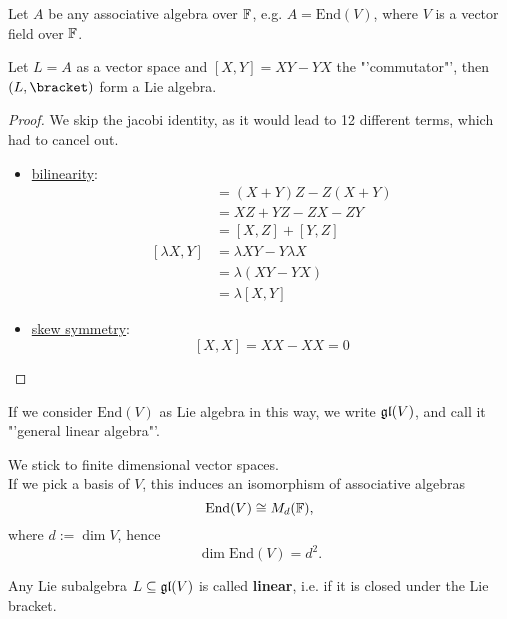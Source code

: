 \begin{example}
    Let $A$ be any associative algebra over $\mathbb{F}$, e.g. $A = \textrm{End}(V)$, 
    where $V$ is a vector field over $\mathbb{F}$.

    Let $L = A$ as a vector space and $[X,Y] = XY -YX$ the "'commutator"', 
    then $(L, \bracket)$ form a Lie algebra.
\end{example}
\begin{proof} We skip the jacobi identity, as it would lead to 12 different terms, which had to cancel out.
    \begin{itemize}
        \item \underline{bilinearity}:
        \begin{align*}
            [X + Y, Z] &= (X + Y)Z - Z(X + Y) \\
                       &= XZ + YZ - ZX - ZY \\
                       &= [X,Z] + [Y,Z] \\
            [\lambda X, Y] &= \lambda XY - Y\lambda X \\
                           &= \lambda (XY -YX) \\
                           &= \lambda [X,Y]
        \end{align*}

        \item \underline{skew symmetry}:
        $$ [X,X] = XX - XX = 0 $$
    \end{itemize}
\end{proof}

\begin{definition}
    If we consider $\textrm{End}(V)$ as Lie algebra in this way, we write $\mathfrak{gl} (V)$, and call it
    "'general linear algebra"'.
\end{definition}

\begin{remark}
    We stick to finite dimensional vector spaces.\\
    If we pick a basis of $V$, this induces an isomorphism of associative algebras
    $$ \textrm{End}(V) \cong M_d(\mathbb{F}), $$ where $d := \dim V$, 
    hence
    $$ \dim \textrm{End}(V) = d^2. $$
\end{remark}

\begin{definition}
    Any Lie subalgebra $L \subseteq \mathfrak{gl}(V)$ is called \textbf{linear}, i.e.
    if it is closed under the Lie bracket. 
\end{definition}

